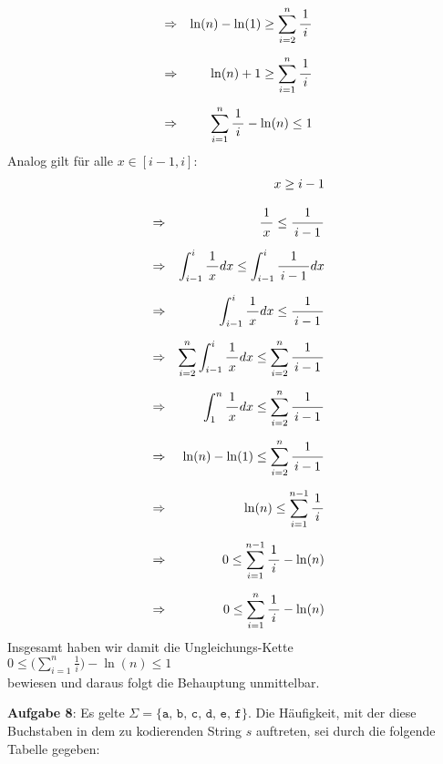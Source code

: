 \documentclass{article}
\newcommand{\bruch}[2]{\frac{\displaystyle \raisebox{1pt}[0pt][-0pt]{$\,#1\,$}}{\displaystyle \raisebox{0pt}[9pt]{$\,#2\,$}}}
\begin{document}
\begin{enumerate}
\begin{eqnarray*}
      & \Rightarrow & \ln(n) - \ln(1) \geq \sum\limits_{i=2}^{n} \bruch{1}{i} \\[0.2cm]
      & \Rightarrow & \ln(n) + 1 \geq \sum\limits_{i=1}^{n} \bruch{1}{i} \\[0.2cm]
      & \Rightarrow & \sum\limits_{i=1}^{n} \bruch{1}{i} - \ln(n) \leq 1 
      \end{eqnarray*}
      Analog gilt f\"ur alle $x \in [i-1,i]$:
      \begin{eqnarray*}
      &             & x \geq i - 1 \\[0.3cm]
      & \Rightarrow & \bruch{1}{x} \leq \bruch{1}{i-1} \\[0.2cm]
      & \Rightarrow & \int_{i-1}^i \bruch{1}{x} dx \leq \int_{i-1}^i \bruch{1}{i-1} dx \\[0.2cm]
      & \Rightarrow & \int_{i-1}^i \bruch{1}{x} dx \leq \bruch{1}{i-1} \\[0.2cm]
      & \Rightarrow & \sum\limits_{i=2}^{n} \int_{i-1}^i \bruch{1}{x} dx \leq 
                      \sum\limits_{i=2}^{n} \bruch{1}{i-1}                      \\[0.2cm]
      & \Rightarrow & \int_{1}^n \bruch{1}{x} dx \leq \sum\limits_{i=2}^{n} \bruch{1}{i-1} \\[0.2cm]
      & \Rightarrow & \ln(n) - \ln(1) \leq \sum\limits_{i=2}^{n} \bruch{1}{i-1} \\[0.2cm]
      & \Rightarrow & \ln(n) \leq \sum\limits_{i=1}^{n-1} \bruch{1}{i} \\[0.2cm]
      & \Rightarrow & 0 \leq \sum\limits_{i=1}^{n-1} \bruch{1}{i} - \ln(n) \\[0.2cm]
      & \Rightarrow & 0 \leq \sum\limits_{i=1}^{n} \bruch{1}{i} - \ln(n) 
      \end{eqnarray*}
      Insgesamt haben wir damit die Ungleichungs-Kette
      \\[0.2cm]
      \hspace*{1.3cm}
      $0 \leq \biggl(\sum\limits_{i=1}^n \frac{1}{i}\biggr) - \ln(n) \leq 1$
      \\[0.2cm]
      bewiesen und daraus folgt die Behauptung unmittelbar.
\end{enumerate}
\pagebreak


\noindent
\textbf{Aufgabe 8}:
Es gelte $\Sigma = \{ \mathtt{a},\,\mathtt{b},\,\mathtt{c},\,\mathtt{d},\,\mathtt{e},\,\mathtt{f} \}$.
Die H\"aufigkeit, mit der diese Buchstaben in dem zu kodierenden String $s$ auftreten, sei durch die
folgende Tabelle gegeben:
\end{document}

